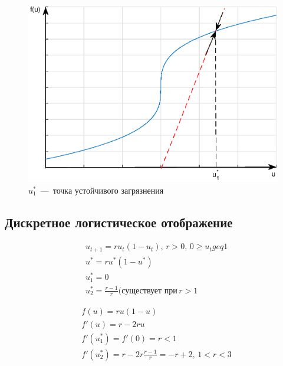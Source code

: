 \pagebreak

\begin{figure}[t]
\begin{center}
\includegraphics[width=0.5\linewidth]{ch1/ch1_fig4.eps}
\caption{$u_1^*$~---~точка устойчивого загрязнения}
\label{ch1.fig4}
\end{center}
\end{figure}

\subsection*{Дискретное логистическое отображение}
\begin{multicols}{2}
\begin{equation*}
\begin{aligned}
&u_{t+1} = ru_t (1 - u_t), \, r>0, \, 0 \geq u_t geq 1\\
&u^* = r u^* (1 - u^*)\\
&u_1^* = 0\\
&u_2^* = \frac{r - 1}{r} (\text{существует при}\, r>1
\end{aligned}
\end{equation*}

\begin{equation*}
\begin{aligned}
&f(u) = ru(1 - u)\\
&f'(u) = r - 2ru\\
&f'(u_1^*) = f'(0) = r < 1\\
&f'(u_2^*) = r - 2r \frac{r - 1}{r} = -r + 2, \, 1<r<3
\end{aligned}
\end{equation*}
\end{multicols}

